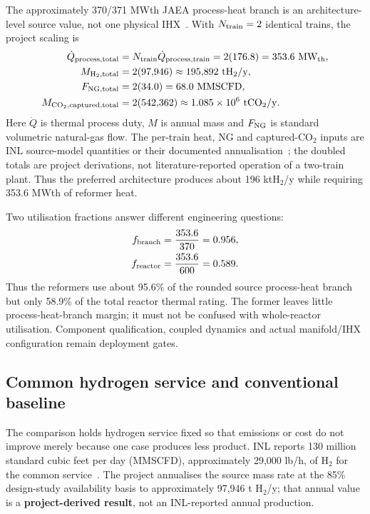 The approximately 370/371 MWth JAEA process-heat branch is an architecture-level source value, not one physical IHX~\cite{nishihara2007potential}. With $N_{\rm train}=2$ identical trains, the project scaling is
\begin{align}
\dot Q_{\rm process,total}
&=N_{\rm train}\dot Q_{\rm process,train}
=2(176.8)=353.6~\mathrm{MW_{th}},\\
M_{\mathrm{H_2,total}}
&=2(97{,}946)\approx195{,}892~\mathrm{tH_2/y},\\
F_{\rm NG,total}
&=2(34.0)=68.0~\mathrm{MMSCFD},\\
M_{\mathrm{CO_2,captured,total}}
&=2(542{,}362)\approx1.085\times10^6~\mathrm{tCO_2/y}.
\end{align}
Here $\dot Q$ is thermal process duty, $M$ is annual mass and $F_{\rm NG}$ is standard volumetric natural-gas flow. The per-train heat, NG and captured-CO$_2$ inputs are INL source-model quantities or their documented annualisation~\cite{inltev953,inltev961}; the doubled totals are project derivations, not literature-reported operation of a two-train plant. Thus the preferred architecture produces about 196 ktH$_2$/y while requiring 353.6 MWth of reformer heat.

Two utilisation fractions answer different engineering questions:
\begin{align}
f_{\rm branch}&=\frac{353.6}{370}=0.956,\\
f_{\rm reactor}&=\frac{353.6}{600}=0.589.
\end{align}
Thus the reformers use about 95.6\% of the rounded source process-heat branch but only 58.9\% of the total reactor thermal rating. The former leaves little process-heat-branch margin; it must not be confused with whole-reactor utilisation. Component qualification, coupled dynamics and actual manifold/IHX configuration remain deployment gates.

\subsection{Common hydrogen service and conventional baseline}
The comparison holds hydrogen service fixed so that emissions or cost do not improve merely because one case produces less product. INL reports 130 million standard cubic feet per day (MMSCFD), approximately 29,000 lb/h, of H$_2$ for the common service~\cite{inltev953,inltev961}. The project annualises the source mass rate at the 85\% design-study availability basis to approximately 97,946 t H$_2$/y; that annual value is a \textbf{project-derived result}, not an INL-reported annual production.

